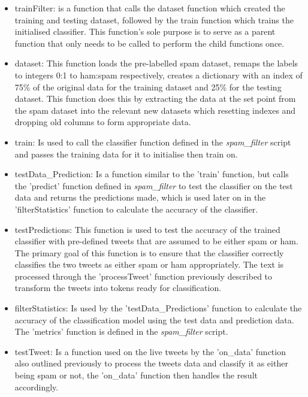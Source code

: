 \documentclass[oneside, 12pt]{article}
\begin{document}
		\begin{itemize}
			\item trainFilter: is a function that calls the dataset function which created the training and testing dataset, followed by the train function which trains the initialised classifier. This function's sole purpose is to serve as a parent function that only needs to be called to perform the child functions once.
			\item dataset: This function loads the pre-labelled spam dataset, remaps the labels to integers 0:1 to ham:spam respectively, creates a dictionary with an index of 75\% of the original data for the training dataset and 25\% for the testing dataset. This function does this by extracting the data at the set point from the spam dataset into the relevant new datasets which resetting indexes and dropping old columns to form appropriate data.
			\item train: Is used to call the classifier function defined in the \textit{spam\_filter} script and passes the training data for it to initialise then train on.
			\item testData\_Prediction: Is a function similar to the 'train' function, but calls the 'predict' function defined in \textit{spam\_filter} to test the classifier on the test data and returns the predictions made, which is used later on in the 'filterStatistics' function to calculate the accuracy of the classifier.
			\item testPredictions: This function is used to test the accuracy of the trained classifier with pre-defined tweets that are assumed to be either spam or ham. The primary goal of this function is to ensure that the classifier correctly classifies the two tweets as either spam or ham appropriately. The text is processed through the 'processTweet' function previously described to transform the tweets into tokens ready for classification.
			\item filterStatistics: Is used by the 'testData\_Predictions' function to calculate the accuracy of the classification model using the test data and prediction data. The 'metrics' function is defined in the \textit{spam\_filter} script.
			\item testTweet: Is a function used on the live tweets by the 'on\_data' function also outlined previously to process the tweets data and classify it as either being spam or not, the 'on\_data' function then handles the result accordingly.
		\end{itemize}		
		
\end{document}
